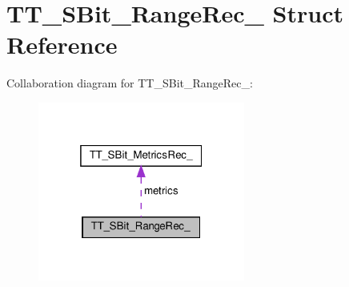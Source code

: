 \hypertarget{structTT__SBit__RangeRec__}{}\section{T\+T\+\_\+\+S\+Bit\+\_\+\+Range\+Rec\+\_\+ Struct Reference}
\label{structTT__SBit__RangeRec__}


Collaboration diagram for T\+T\+\_\+\+S\+Bit\+\_\+\+Range\+Rec\+\_\+\+:
\nopagebreak
\begin{figure}[H]
\begin{center}
\leavevmode
\includegraphics[width=193pt]{structTT__SBit__RangeRec____coll__graph}
\end{center}
\end{figure}
